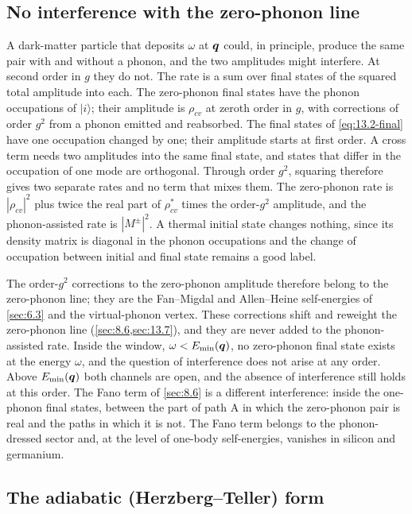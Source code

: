 \subsection{No interference with the zero-phonon line}

A dark-matter particle that deposits $\omega$ at $\bm{q}$ could, in principle, produce the same pair with and without a phonon, and the two amplitudes might interfere. At second order in $g$ they do not. The rate is a sum over final states of the squared total amplitude into each. The zero-phonon final states have the phonon occupations of $|i\rangle$; their amplitude is $\rho_{cv}$ at zeroth order in $g$, with corrections of order $g^2$ from a phonon emitted and reabsorbed. The final states of \cref{eq:13.2-final} have one occupation changed by one; their amplitude starts at first order. A cross term needs two amplitudes into the same final state, and states that differ in the occupation of one mode are orthogonal. Through order $g^2$, squaring therefore gives two separate rates and no term that mixes them. The zero-phonon rate is $|\rho_{cv}|^2$ plus twice the real part of $\rho_{cv}^*$ times the order-$g^2$ amplitude, and the phonon-assisted rate is $|M^\pm|^2$. A thermal initial state changes nothing, since its density matrix is diagonal in the phonon occupations and the change of occupation between initial and final state remains a good label.

The order-$g^2$ corrections to the zero-phonon amplitude therefore belong to the zero-phonon line; they are the Fan--Migdal and Allen--Heine self-energies of \cref{sec:6.3} and the virtual-phonon vertex. These corrections shift and reweight the zero-phonon line (\cref{sec:8.6,sec:13.7}), and they are never added to the phonon-assisted rate. Inside the window, $\omega < E_{\mathrm{min}}(\bm{q})$, no zero-phonon final state exists at the energy $\omega$, and the question of interference does not arise at any order. Above $E_{\mathrm{min}}(\bm{q})$ both channels are open, and the absence of interference still holds at this order. The Fano term of \cref{sec:8.6} is a different interference: inside the one-phonon final states, between the part of path A in which the zero-phonon pair is real and the paths in which it is not. The Fano term belongs to the phonon-dressed sector and, at the level of one-body self-energies, vanishes in silicon and germanium.

\subsection{The adiabatic (Herzberg--Teller) form}

